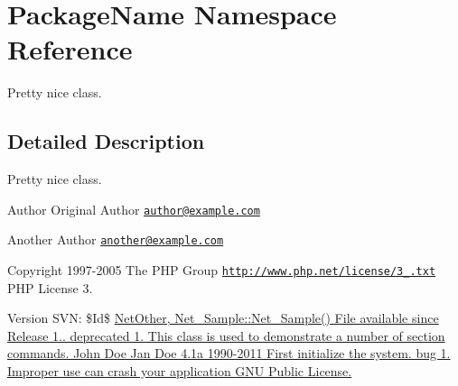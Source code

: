 \hypertarget{namespace_package_name}{\section{Package\-Name Namespace Reference}
\label{namespace_package_name}
}


Pretty nice class.  




\subsection{Detailed Description}
Pretty nice class. \begin{DoxyAuthor}{Author}
Original Author \href{mailto:author@example.com}{\tt author@example.\-com} 

Another Author \href{mailto:another@example.com}{\tt another@example.\-com} 
\end{DoxyAuthor}
\begin{DoxyCopyright}{Copyright}
1997-\/2005 The P\-H\-P Group  \href{http://www.php.net/license/3_01.txt}{\tt http\-://www.\-php.\-net/license/3\-\_.\-txt} P\-H\-P License 3. 
\end{DoxyCopyright}
\begin{DoxyVersion}{Version}
S\-V\-N\-: \$\-Id\$ \hyperlink{}{Net\-Other, Net\-\_\-\-Sample\-::\-Net\-\_\-\-Sample()  File available since Release 1..  deprecated 1. This class is used to demonstrate a number of section commands.  John Doe  Jan Doe  4.\-1a  1990-\/2011  First initialize the system.  bug 1.  Improper use can crash your application  G\-N\-U Public License. }
\end{DoxyVersion}
